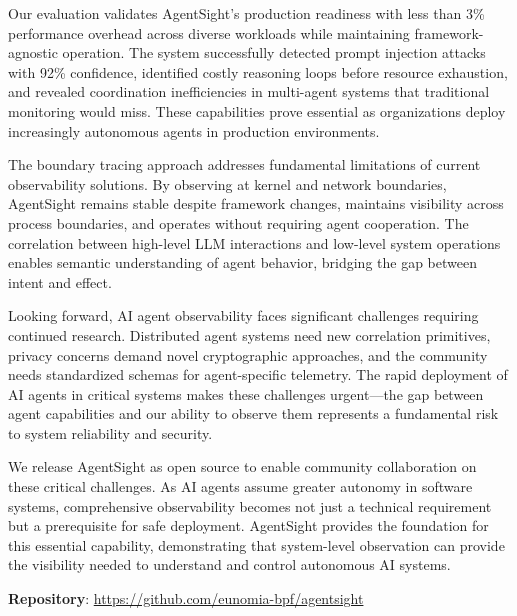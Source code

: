 Our evaluation validates AgentSight's production readiness with less than 3\% performance overhead across diverse workloads while maintaining framework-agnostic operation. The system successfully detected prompt injection attacks with 92\% confidence, identified costly reasoning loops before resource exhaustion, and revealed coordination inefficiencies in multi-agent systems that traditional monitoring would miss. These capabilities prove essential as organizations deploy increasingly autonomous agents in production environments.

The boundary tracing approach addresses fundamental limitations of current observability solutions. By observing at kernel and network boundaries, AgentSight remains stable despite framework changes, maintains visibility across process boundaries, and operates without requiring agent cooperation. The correlation between high-level LLM interactions and low-level system operations enables semantic understanding of agent behavior, bridging the gap between intent and effect.

Looking forward, AI agent observability faces significant challenges requiring continued research. Distributed agent systems need new correlation primitives, privacy concerns demand novel cryptographic approaches, and the community needs standardized schemas for agent-specific telemetry. The rapid deployment of AI agents in critical systems makes these challenges urgent—the gap between agent capabilities and our ability to observe them represents a fundamental risk to system reliability and security.

We release AgentSight as open source to enable community collaboration on these critical challenges. As AI agents assume greater autonomy in software systems, comprehensive observability becomes not just a technical requirement but a prerequisite for safe deployment. AgentSight provides the foundation for this essential capability, demonstrating that system-level observation can provide the visibility needed to understand and control autonomous AI systems.

\textbf{Repository}: \url{https://github.com/eunomia-bpf/agentsight}




